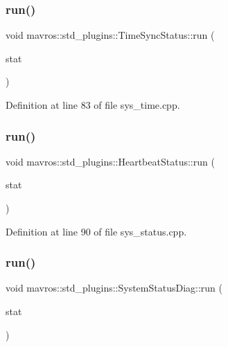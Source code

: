 \subsubsection{\texorpdfstring{run()}{run()}\hspace{0.1cm}{\footnotesize\ttfamily [1/6]}}
{\footnotesize\ttfamily void mavros\+::std\+\_\+plugins\+::\+Time\+Sync\+Status\+::run (\begin{DoxyParamCaption}\item[{diagnostic\+\_\+updater\+::\+Diagnostic\+Status\+Wrapper \&}]{stat }\end{DoxyParamCaption})\hspace{0.3cm}{\ttfamily [inline]}}



Definition at line 83 of file sys\+\_\+time.\+cpp.

\mbox{\label{group__plugin_gaf1e9db0d3abf74c3025084c4a4dbae8a}} 
\subsubsection{\texorpdfstring{run()}{run()}\hspace{0.1cm}{\footnotesize\ttfamily [2/6]}}
{\footnotesize\ttfamily void mavros\+::std\+\_\+plugins\+::\+Heartbeat\+Status\+::run (\begin{DoxyParamCaption}\item[{diagnostic\+\_\+updater\+::\+Diagnostic\+Status\+Wrapper \&}]{stat }\end{DoxyParamCaption})\hspace{0.3cm}{\ttfamily [inline]}}



Definition at line 90 of file sys\+\_\+status.\+cpp.

\mbox{\label{group__plugin_ga41ef975786e414cd2a33deb33de19847}} 
\subsubsection{\texorpdfstring{run()}{run()}\hspace{0.1cm}{\footnotesize\ttfamily [3/6]}}
{\footnotesize\ttfamily void mavros\+::std\+\_\+plugins\+::\+System\+Status\+Diag\+::run (\begin{DoxyParamCaption}\item[{diagnostic\+\_\+updater\+::\+Diagnostic\+Status\+Wrapper \&}]{stat }\end{DoxyParamCaption})\hspace{0.3cm}{\ttfamily [inline]}}



